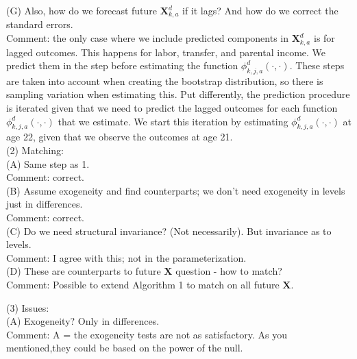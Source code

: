 \noindent (G) Also, how do we forecast future $ \bm{X}_{k,a}^d$ if it lags? And how do we correct the standard errors.\\
\noindent Comment: the only case where we include predicted components in $ \bm{X}_{k,a}^d$ is for lagged outcomes. This happens for labor, transfer, and parental income. We predict them in the step before estimating the function $\phi_{k,j,a}^d \left( \cdot, \cdot \right)$. These steps are taken into account when creating the bootstrap distribution, so there is sampling variation when estimating this. Put differently, the prediction procedure is iterated given that we need to predict the lagged outcomes for each function $\phi_{k,j,a}^d \left( \cdot, \cdot \right)$ that we estimate. We start this iteration by estimating $\phi_{k,j,a}^d \left( \cdot, \cdot \right)$ at age 22, given that we observe the outcomes at age 21.\\ 



\noindent (2) Matching:\\ 
\noindent (A) Same step as 1.\\
\noindent Comment: correct.\\

\noindent (B) Assume exogeneity and find counterparts; we don't need exogeneity in levels just in differences.\\
\noindent Comment: correct.\\

\noindent (C) Do we need structural invariance? (Not necessarily). But invariance as to levels.\\
\noindent Comment: I agree with this; not in the parameterization.\\

\noindent (D) These are counterparts to future $\bm{X}$ question - how to match?\\ 
\noindent Comment: Possible to extend Algorithm 1 to match on all future $\bm{X}$. 

\noindent (3) Issues:\\

\noindent (A) Exogeneity? Only in differences. \\
\noindent Comment: A = the exogeneity tests are not as satisfactory. As you mentioned,they could be based on the power of the null.\\

